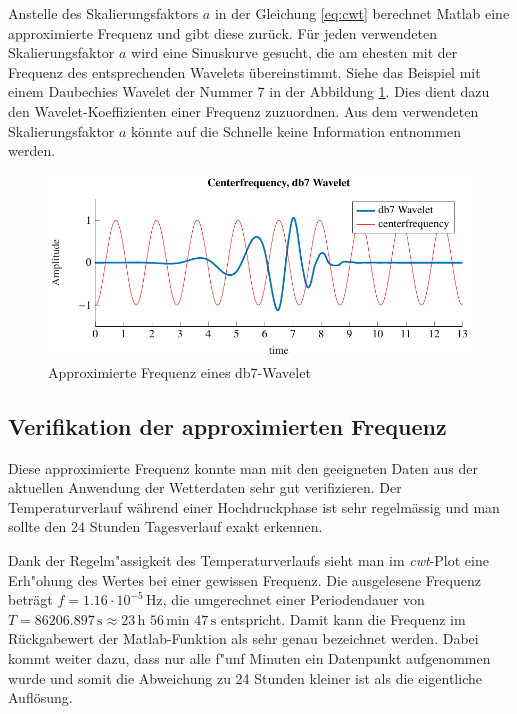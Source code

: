 \begin{refsection}
Anstelle des Skalierungsfaktors $a$ in der Gleichung \ref{eq:cwt} berechnet Matlab eine approximierte Frequenz und gibt diese zurück.
Für jeden verwendeten Skalierungsfaktor $a$ wird eine Sinuskurve gesucht, die am ehesten mit der Frequenz des entsprechenden Wavelets übereinstimmt.
Siehe das Beispiel mit einem Daubechies Wavelet der Nummer 7 in der Abbildung \ref{fig:centerf}.
Dies dient dazu den Wavelet-Koeffizienten einer Frequenz zuzuordnen. 
Aus dem verwendeten Skalierungsfaktor $a$ könnte auf die Schnelle keine Information entnommen werden.
\begin{figure}[h]
	\centering
	\includegraphics[width=1\textwidth]{papers/wwt/images/centerf.pdf}
	\caption{Approximierte Frequenz eines db7-Wavelet}
	\label{fig:centerf}
\end{figure}

\subsection{Verifikation der approximierten Frequenz}
\label{Freq}
Diese approximierte Frequenz konnte man mit den geeigneten Daten aus der aktuellen Anwendung der Wetterdaten sehr gut verifizieren.
Der Temperaturverlauf während einer Hochdruckphase ist sehr regelmässig und man sollte den 24 Stunden Tagesverlauf exakt erkennen.

Dank der Regelm"assigkeit des Temperaturverlaufs sieht man im \textit{cwt}-Plot eine Erh"ohung des Wertes bei einer gewissen Frequenz.
Die ausgelesene Frequenz beträgt $f = 1.16\cdot10^{-5} \,\text{Hz}$, die umgerechnet einer Periodendauer von $T = 86206.897\,\text{s}\approx 23\,\text{h }56\,\text{min } 47\,\text{s}$ entspricht.
Damit kann die Frequenz im Rückgabewert der Matlab-Funktion als sehr genau bezeichnet werden.
Dabei kommt weiter dazu, dass nur alle f"unf Minuten ein Datenpunkt aufgenommen wurde und somit die Abweichung zu 24 Stunden kleiner ist als die eigentliche Auflösung.


\end{refsection}
